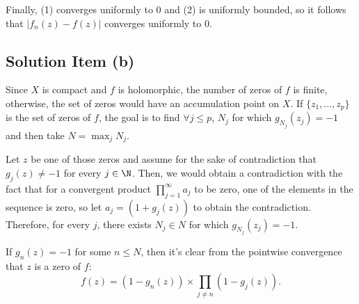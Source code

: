 Finally, (1) converges uniformly to 0 and (2) is uniformly bounded, so it follows that $|f_n(z) - f(z)|$ converges uniformly to 0.

\subsection*{Solution Item (b)}

Since $X$ is compact and $f$ is holomorphic, the number of zeros of $f$ is finite, otherwise, the set of zeros would have an accumulation point on $X$. If $\{z_1,\ldots, z_p\}$ is the set of zeros of $f$, the goal is to find $\forall j \leq p$, $N_j$ for which $g_{N_j}(z_j) = -1$ and then take $N = \max_j N_j$.

Let $z$ be one of those zeros and assume for the sake of contradiction that $g_j(z) \neq -1$ for every $j\in \N$. Then, we would obtain a contradiction with the fact that for a convergent product $\prod_{j= 1}^\infty a_j$ to be zero, one of the elements in the sequence is zero, so let $a_j = (1+g_j(z))$ to obtain the contradiction. Therefore, for every $j$, there exists $N_j\in N$ for which $g_{N_j}(z_j) = -1$.

If $g_n(z) = -1$ for some $n \leq N$, then it's clear from the pointwise convergence that $z$ is a zero of $f$:
\[ f(z) = (1 - g_n(z)) \times \prod_{j\neq n} (1-g_j(z)). \]